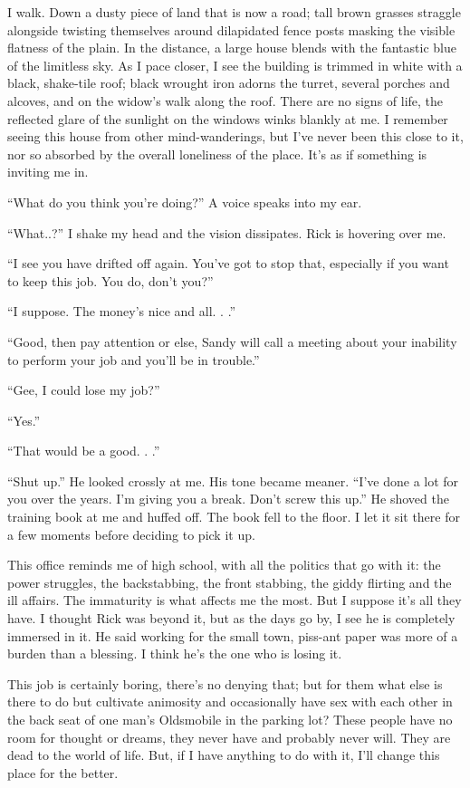 \documentclass[
]{article}
\begin{document}
I walk. Down a dusty piece of land that is now a road; tall brown
grasses straggle alongside twisting themselves around dilapidated fence
posts masking the visible flatness of the plain. In the distance, a
large house blends with the fantastic blue of the limitless sky. As I
pace closer, I see the building is trimmed in white with a black,
shake-tile roof; black wrought iron adorns the turret, several porches
and alcoves, and on the widow's walk along the roof. There are no signs
of life, the reflected glare of the sunlight on the windows winks
blankly at me. I remember seeing this house from other mind-wanderings,
but I've never been this close to it, nor so absorbed by the overall
loneliness of the place. It's as if something is inviting me in.

``What do you think you're doing?'' A voice speaks into my ear.

``What..?'' I shake my head and the vision dissipates. Rick is hovering
over me.

``I see you have drifted off again. You've got to stop that, especially
if you want to keep this job. You do, don't you?''

``I suppose. The money's nice and all. . .''

``Good, then pay attention or else, Sandy will call a meeting about your
inability to perform your job and you'll be in trouble.''

``Gee, I could lose my job?''

``Yes.''

``That would be a good. . .''

``Shut up.'' He looked crossly at me. His tone became meaner. ``I've
done a lot for you over the years. I'm giving you a break. Don't screw
this up.'' He shoved the training book at me and huffed off. The book
fell to the floor. I let it sit there for a few moments before deciding
to pick it up.

This office reminds me of high school, with all the politics that go
with it: the power struggles, the backstabbing, the front stabbing, the
giddy flirting and the ill affairs. The immaturity is what affects me
the most. But I suppose it's all they have. I thought Rick was beyond
it, but as the days go by, I see he is completely immersed in it. He
said working for the small town, piss-ant paper was more of a burden
than a blessing. I think he's the one who is losing it.

This job is certainly boring, there's no denying that; but for them what
else is there to do but cultivate animosity and occasionally have sex
with each other in the back seat of one man's Oldsmobile in the parking
lot? These people have no room for thought or dreams, they never have
and probably never will. They are dead to the world of life. But, if I
have anything to do with it, I'll change this place for the better.
\end{document}
